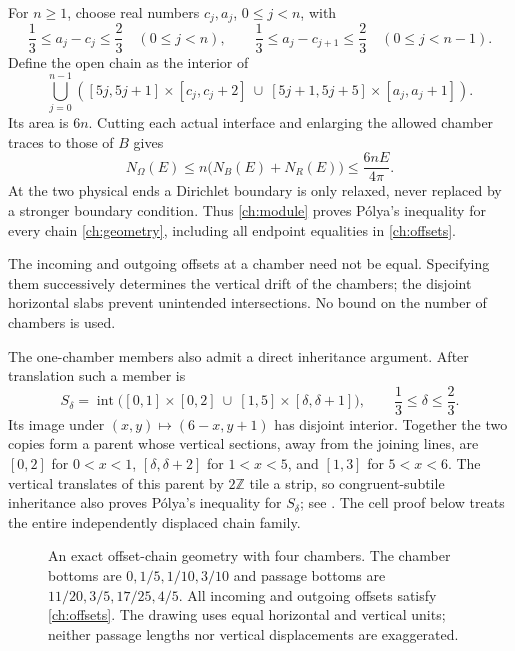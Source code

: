 \documentclass[11pt,reqno]{amsart}
\numberwithin{equation}{section}
\newcommand{\Om}{\Omega}
\begin{document}
For $n\ge1$, choose real numbers $c_j,a_j$, $0\le j<n$, with
\begin{equation}\label{ch:offsets}
 \frac13\le a_j-c_j\le\frac23\quad(0\le j<n),\qquad
 \frac13\le a_j-c_{j+1}\le\frac23\quad(0\le j<n-1).
\end{equation}
Define the open chain as the interior of
\begin{equation}\label{ch:geometry}
 \bigcup_{j=0}^{n-1}\left(
 [5j,5j+1]\times[c_j,c_j+2]
 \ \cup\ [5j+1,5j+5]\times[a_j,a_j+1]\right).
\end{equation}
Its area is $6n$. Cutting each actual interface and enlarging the
allowed chamber traces to those of $B$ gives
\[
 N_\Om(E)\le n\bigl(N_B(E)+N_R(E)\bigr)
 \le\frac{6nE}{4\pi}.
\]
At the two physical ends a Dirichlet boundary is only relaxed,
never replaced by a stronger boundary condition. Thus
\eqref{ch:module} proves P\'olya's inequality for every chain
\eqref{ch:geometry}, including all endpoint equalities in
\eqref{ch:offsets}.

The incoming and outgoing offsets at a chamber need not be equal.
Specifying them successively determines the vertical drift of the
chambers; the disjoint horizontal slabs prevent unintended
intersections. No bound on the number of chambers is used.

The one-chamber members also admit a direct inheritance argument.
After translation such a member is
\[
 S_\delta=\operatorname{int}\bigl(
 [0,1]\times[0,2]\ \cup\ [1,5]\times[\delta,\delta+1]\bigr),
 \qquad\frac13\le\delta\le\frac23.
\]
Its image under $(x,y)\mapsto(6-x,y+1)$ has disjoint interior.
Together the two copies form a parent whose vertical sections,
away from the joining lines, are $[0,2]$ for $0<x<1$,
$[\delta,\delta+2]$ for $1<x<5$, and $[1,3]$ for $5<x<6$.
The vertical translates of this parent by $2\mathbb Z$ tile a
strip, so congruent-subtile inheritance also proves P\'olya's
inequality for $S_\delta$; see \cite{FLPS,JiangLin}. The cell
proof below treats the entire independently displaced chain family.

\begin{figure}[tb]
\centering
{}
\caption{An exact offset-chain geometry with four chambers. The
chamber bottoms are $0,1/5,1/10,3/10$ and passage bottoms are
$11/20,3/5,17/25,4/5$. All incoming and outgoing offsets satisfy
\eqref{ch:offsets}. The drawing uses equal horizontal and vertical
units; neither passage lengths nor vertical displacements are exaggerated.}
\label{fig:chain}
\end{figure}
\end{document}
